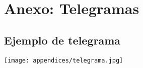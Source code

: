 \chapter{Anexo: Telegramas}

\label{anexo:telegramas}

\section{Ejemplo de telegrama}

\texttt{[image: appendices/telegrama.jpg]}